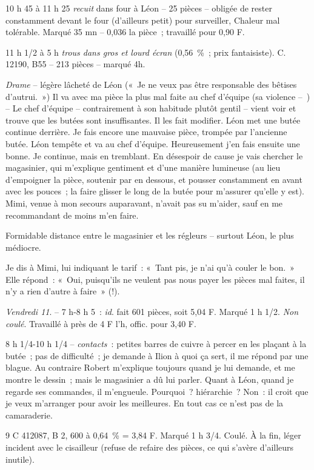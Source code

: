 \documentclass[french,twoside]{book} %
\begin{document}
\par
10 h 45 à 11 h 25 {\itshape recuit} dans four à Léon – 25 pièces – obligée de rester constamment devant le four (d'ailleurs petit) pour surveiller, Chaleur mal tolérable. Marqué 35 mn – 0,036 la pièce ; travaillé pour 0,90 F.\par
11 h 1/2 à 5 h {\itshape trous dans gros et lourd écran} (0,56 \% ; prix fantaisiste). C. 12190, B55 – 213 pièces – marqué 4h.\par
{\itshape Drame} – légère lâcheté de Léon (« Je ne veux pas être responsable des bêtises d'autrui. ») Il va avec ma pièce la plus mal faite au chef d'équipe (sa violence – ) – Le chef d'équipe – contrairement à son habitude plutôt gentil – vient voir et trouve que les butées sont insuffisantes. Il les fait modifier. Léon met une butée continue derrière. Je fais encore une mauvaise pièce, trompée par l'ancienne butée. Léon tempête et va au chef d'équipe. Heureusement j'en fais ensuite une bonne. Je continue, mais en tremblant. En désespoir de cause je vais chercher le magasinier, qui m'explique gentiment et d'une manière lumineuse (au lieu d'empoigner la pièce, soutenir par en dessous, et pousser constamment en avant avec les pouces ; la faire glisser le long de la butée pour m'assurer qu'elle y est). Mimi, venue à mon secours auparavant, n'avait pas su m'aider, sauf en me recommandant de moins m'en faire.\par
Formidable distance entre le magasinier et les régleurs – surtout Léon, le plus médiocre.\par
Je dis à Mimi, lui indiquant le tarif : « Tant pis, je n'ai qu'à couler le bon. » Elle répond : « Oui, puisqu'ils ne veulent pas nous payer les pièces mal faites, il n'y a rien d'autre à faire » (!).\par
{\itshape Vendredi 11}. – 7 h-8 h 5 : {\itshape id}. fait 601 pièces, soit 5,04 F. Marqué 1 h 1/2. {\itshape Non coulé}. Travaillé à près de 4 F l'h, offic. pour 3,40 F.\par
8 h 1/4-10 h 1/4 – {\itshape contacts} : petites barres de cuivre à percer en les plaçant à la butée ; pas de difficulté ; je demande à Ilion à quoi ça sert, il me répond par une blague. Au contraire Robert m'explique toujours quand je lui demande, et me montre le dessin ; mais le magasinier a dû lui parler. Quant à Léon, quand je regarde ses commandes, il m'engueule. Pourquoi ? hiérarchie ? Non : il croit que je veux m'arranger pour avoir les meilleures. En tout cas ce n'est pas de la camaraderie.\par
9 C 412087, B 2, 600 à 0,64 \% = 3,84 F. Marqué 1 h 3/4. Coulé. À la fin, léger incident avec le cisailleur (refuse de refaire des pièces, ce qui s'avère d'ailleurs inutile).\par
\end{document}

